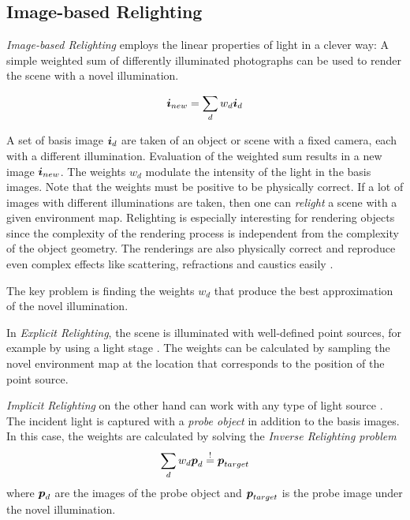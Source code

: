 \subsection{Image-based Relighting}
\label{sec:relighting}

 \emph{Image-based Relighting} \cite{choudhury2007survey} employs the linear properties of light in a clever way:
 A simple weighted sum of differently illuminated photographs can be used to render the scene with a novel illumination.
 
 \begin{equation}
  \label{eq:relightsum}
  \boldsymbol{i}_{new} = \sum_{d} w_d \boldsymbol{i}_d
\end{equation}
 
 A set of basis image $\boldsymbol{i}_d$ are taken of an object or scene with a fixed camera, each with a different illumination.
 Evaluation of the weighted sum results in a new image $\boldsymbol{i}_{new}$.
 The weights $w_d$ modulate the intensity of the light in the basis images. Note that the weights must be positive to be physically correct.
 If a lot of images with different illuminations are taken, then one can \emph{relight} a scene with a given environment map.
 Relighting is especially interesting for rendering objects since the complexity of the rendering process is independent from the complexity of the object geometry.
 The renderings are also physically correct and reproduce even complex effects like scattering, refractions and caustics easily \cite{choudhury2007survey}.
 
 
 The key problem is finding the weights $w_d$ that produce the best approximation of the novel illumination.
 
 In \emph{Explicit Relighting}, the scene is illuminated with well-defined point sources, for example by using a light stage \cite{debevec2002lighting}.
 The weights can be calculated by sampling the novel environment map at the location that corresponds to the position of the point source.

 \emph{Implicit Relighting} on the other hand can work with any type of light source \cite{choudhury2007survey}.
 The incident light is captured with a \emph{probe object} in addition to the basis images.
 In this case, the weights are calculated by solving the \emph{Inverse Relighting problem}
 \begin{equation}
  \label{eq:invproblem}
   \sum_{d} w_d \boldsymbol{p}_d \stackrel{!}{=} \boldsymbol{p}_{target} 
 \end{equation}
 where $\boldsymbol{p}_d$ are the images of the probe object and $\boldsymbol{p}_{target}$ is the probe image under the novel illumination.
 
